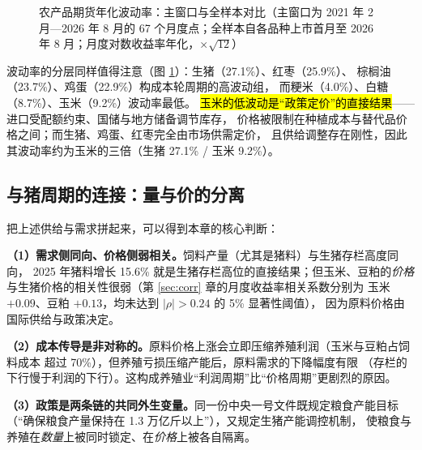\begin{figure}[htbp]
\centering
{}
\caption{农产品期货年化波动率：主窗口与全样本对比（主窗口为 2021 年 2 月---2026 年 8 月的 67 个月度点；全样本自各品种上市首月至 2026 年 8 月；月度对数收益率年化，$\times\sqrt{12}$）}
\label{fig:vol-bar}
\end{figure}

波动率的分层同样值得注意（图 \ref{fig:vol-bar}）：生猪（27.1\%）、红枣（25.9\%）、
棕榈油（23.7\%）、鸡蛋（22.9\%）构成本轮周期的高波动组，
而粳米（4.0\%）、白糖（8.7\%）、玉米（9.2\%）波动率最低。
\hl{玉米的低波动是“政策定价”的直接结果}——进口受配额约束、国储与地方储备调节库存，
价格被限制在种植成本与替代品价格之间；而生猪、鸡蛋、红枣完全由市场供需定价，
且供给调整存在刚性，因此其波动率约为玉米的三倍（生猪 27.1\% / 玉米 9.2\%）。

\subsection{与猪周期的连接：量与价的分离}
\label{sec:grain-hog-link}

把上述供给与需求拼起来，可以得到本章的核心判断：

\begin{keybox}[粮食油料与猪周期的连接方式]
\normalsize
\textbf{（1）需求侧同向、价格侧弱相关。}饲料产量（尤其是猪料）与生猪存栏高度同向，
2025 年猪料增长 15.6\% 就是生猪存栏高位的直接结果；但玉米、豆粕的\emph{价格}
与生猪价格的相关性很弱（第 \ref{sec:corr} 章的月度收益率相关系数分别为
玉米 $+0.09$、豆粕 $+0.13$，均未达到 $|\rho|>0.24$ 的 5\% 显著性阈值），
因为原料价格由国际供给与政策决定。\par\vspace{3pt}
\textbf{（2）成本传导是非对称的。}原料价格上涨会立即压缩养殖利润（玉米与豆粕占饲料成本
超过 70\%）\cite{sun2026hog}，但养殖亏损压缩产能后，原料需求的下降幅度有限
（存栏的下行慢于利润的下行）。这构成养殖业“利润周期”比“价格周期”更剧烈的原因。\par\vspace{3pt}
\textbf{（3）政策是两条链的共同外生变量。}同一份中央一号文件既规定粮食产能目标
（“确保粮食产量保持在 1.3 万亿斤以上”）\cite{cccp2024doc1}，又规定生猪产能调控机制，
使粮食与养殖在\emph{数量}上被同时锁定、在\emph{价格}上被各自隔离。
\end{keybox}
